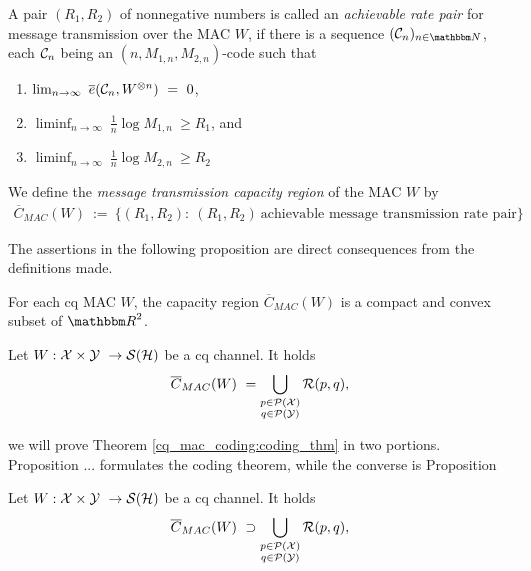 \begin{definition}
A pair $(R_1,R_2)$ of nonnegative numbers is called an \emph{achievable rate pair} for message transmission over the MAC $W$, if there is a sequence $(\cC_n)_{n \in \bbmN}$, each ${\mathcal C}_n$ being an $(n,M_{1,n}, M_{2,n})$-code such that 
\begin{enumerate}
	\item $\lim_{n \rightarrow \infty} \ \overline{e}(\cC_n, W^{\otimes n}) \ = \ 0$,
	\item $\liminf_{n \rightarrow \infty} \ \frac{1}{n} \log M_{1,n} \ \geq R_1$, and
	\item $\liminf_{n \rightarrow \infty} \ \frac{1}{n} \log M_{2,n} \ \geq R_2$
\end{enumerate}
We define the \emph{message transmission capacity region} of the MAC $W$ by 
\begin{align*}
 \overline{C}_{MAC}(W) \ := \ \{(R_1,R_2):\ (R_1,R_2) \ \text{achievable message transmission rate pair} \}
\end{align*}
\end{definition}
The assertions in the following proposition are direct consequences from the definitions made. 
\begin{proposition}
For each cq MAC $W$, the capacity region $\overline{C}_{MAC}(W)$ is a compact and convex subset of $\bbmR^2$.
\end{proposition}

\begin{theorem}\label{cq_mac_coding:coding_thm}
Let $W: {\mathcal X} \times {\mathcal Y} \ \rightarrow {\mathcal S}({\mathcal H})$ be a cq channel. It holds
\begin{align}
\overline{C}_{MAC}(W) \ = \bigcup_{\substack{p \in {\mathcal P}({\mathcal X})\\q \in {\mathcal P}({\mathcal Y})}} {\mathcal R}(p,q),
\end{align}
\end{theorem}
we will prove Theorem \ref{cq_mac_coding:coding_thm} in two portions. Proposition ... formulates the coding theorem, while the converse is Proposition \label{cq_mac_coding:coding_thm}
\begin{proposition}\label{cq_mac_coding:coding_thm}
Let $W: {\mathcal X} \times {\mathcal Y} \ \rightarrow {\mathcal S}({\mathcal H})$ be a cq channel. It holds
\begin{align}
\overline{C}_{MAC}(W) \ \supset \bigcup_{\substack{p \in {\mathcal P}({\mathcal X})\\q \in {\mathcal P}({\mathcal Y})}} {\mathcal R}(p,q),
\end{align}
\end{proposition}

